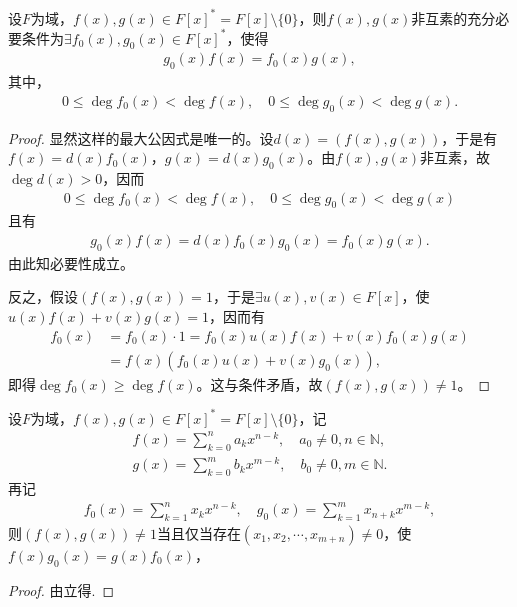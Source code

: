 \documentclass[../../main.tex]{subfiles}%
\begin{document}
\begin{theorem}\label{theorem:抽象代数--定理2.6.3}
设$F$为域，$f(x),g(x)\in F[x]^*=F[x]\setminus \{0\}$，则$f(x),g(x)$非互素的充分必要条件为$\exists f_0(x),g_0(x)\in F[x]^*$，使得
\begin{align*}
g_0(x)f(x)=f_0(x)g(x),
\end{align*}
其中，
\begin{align*}
0\leqslant\deg f_0(x)<\deg f(x),\quad 0\leqslant\deg g_0(x)<\deg g(x).
\end{align*}
\end{theorem}
\begin{proof}
显然这样的最大公因式是唯一的。设$d(x)=(f(x),g(x))$，于是有$f(x)=d(x)f_0(x)$，$g(x)=d(x)g_0(x)$。由$f(x),g(x)$非互素，故$\deg d(x)>0$，因而
\begin{align*}
0\leqslant\deg f_0(x)<\deg f(x),\quad 0\leqslant\deg g_0(x)<\deg g(x)
\end{align*}
且有
\begin{align*}
g_0(x)f(x)=d(x)f_0(x)g_0(x)=f_0(x)g(x).
\end{align*}
由此知必要性成立。

反之，假设$(f(x),g(x))=1$，于是$\exists u(x),v(x)\in F[x]$，使$u(x)f(x)+v(x)g(x)=1$，因而有
\begin{align*}
f_0(x)&=f_0(x)\cdot1=f_0(x)u(x)f(x)+v(x)f_0(x)g(x) \\
&=f(x)(f_0(x)u(x)+v(x)g_0(x)),
\end{align*}
即得$\deg f_0(x)\geqslant\deg f(x)$。这与条件矛盾，故$(f(x),g(x))\neq1$。
\end{proof}

\begin{corollary}\label{corollary:抽象代数----定理2.6.3-推论}
设$F$为域，$f(x),g(x)\in F[x]^*=F[x]\setminus \{0\}$，记
\begin{align*}
f(x)=\sum_{k=0}^n a_kx^{n-k},\quad a_0\neq0,n\in\mathbb{N}, \\
g(x)=\sum_{k=0}^m b_kx^{m-k},\quad b_0\neq0,m\in\mathbb{N}.
\end{align*}
再记
\begin{align*}
f_0(x)=\sum_{k=1}^n x_kx^{n-k},\quad g_0(x)=\sum_{k=1}^m x_{n+k}x^{m-k},
\end{align*}
则$(f(x),g(x))\neq1$当且仅当存在$(x_1,x_2,\cdots,x_{m+n})\neq0$，使$f(x)g_0(x)=g(x)f_0(x)$，
\end{corollary}
\begin{proof}
由立得.
\end{proof}
\end{document}
